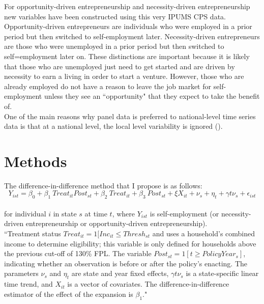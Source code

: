 \documentclass[12pt]{article}
\begin{document}
\begin{titlingpage}
For opportunity-driven entrepreneurship and necessity-driven entrepreneurship new variables have been constructed using this very IPUMS CPS data.  Opportunity-driven entrepreneurs are individuals who were employed in a prior period but then switched to self-employment later. Necessity-driven entrepreneurs are those who were unemployed in a prior period but then switched to self=employment later on. These distinctions are important because it is likely that those who are unemployed just need to get started and are driven by necessity to earn a living in order to start a venture. However, those who are already employed do not have a reason to leave the job market for self-employment unless they see an ``opportunity" that they expect to take the benefit of. 
\\ 

One of the main reasons why panel data is preferred to national-level time series data is that at a national level, the local level variability is ignored (\cite{levitt2001alternative}). \\





\section*{Methods}

The difference-in-difference method that I propose is as follows: \\

\begin{equation}
\mathit{Y}_{ist} = \beta_0 + \beta_1 ~ \mathit{Treat}_{it} \mathit{Post}_{st} + \beta_2 ~ \mathit{Treat}_{it} + \beta_3 ~ \mathit{Post}_{st} + \xi X_{it} + \nu_s  + \eta_t + \gamma t\nu_s + \epsilon_{ist}
\end{equation}  \\


for individual \(i \) in state $s$ at time $t$, where $Y_{ist}$ is self-employment (or necessity-driven entrepreneurship or opportunity-driven entrepreneurship).   \\


``Treatment status $Treat_{it} = 1[Inc_{it} \leq Thresh_{st} $ and uses a household’s combined income to determine eligibility; this variable is only defined for households above the previous cut-off of 130\% FPL. The variable $Post_{st} = 1[t \geq PolicyYear_s]$, indicating whether an observation is before or after the policy’s enacting. The parameters $\nu_s$ and $\eta_t$ are state and year fixed effects, $\gamma t \nu_s$ is a state-specific linear time trend, and $X_{it}$ is a vector of
covariates. The difference-in-difference estimator of the effect of the expansion is $\beta_1$." \cite{olds2016food} 





\end{titlingpage}
\end{document}
